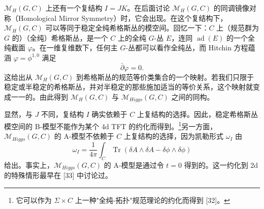 \documentclass[11pt,a4paper,UTF8]{ctexart}
\begin{document}

    $\mathcal{M}_{H}(G,C)$ 上还有一个复结构 $I=JK$。在后面讨论 $\mathcal{M}_{H}(G,C)$ 的同调镜像对称（Homological Mirror Symmetry）时，它会出现。在这个复结构下，$\mathcal{M}_{H}(G,C)$ 可以等同于稳定全纯希格斯丛的模空间。回忆一下：$C$ 上（规范群为 $G$ 的）（全纯）希格斯丛，是一个 $C$ 上的全纯 $G$-丛 $E$，连同 $\operatorname{ad}(E)$ 的一个全纯截面 $\varphi$。在一维复维数下，任何主 $G$-丛都可以看作全纯丛，而 Hitchin 方程蕴涵 $\varphi=\phi^{1,0}$ 满足
\[
    \bar\partial\varphi=0.
\]
这给出从 $\mathcal{M}_{H}(G,C)$ 到希格斯丛的规范等价类集合的一个映射。若我们只限于稳定或半稳定的希格斯丛，并对半稳定的那些施加适当的等价关系，这个映射就变成一一的。由此得到 $\mathcal{M}_{H}(G,C)$ 与 $\mathcal{M}_{Higgs}(G,C)$ 之间的同构。


显然，与 $J$ 不同，复结构 $I$ 确实依赖于 $C$ 上复结构的选择。因此，稳定希格斯丛模空间的 B-模型不能作为某个 4d TFT 的约化而得到。\footnote{它可以作为 $\Sigma\times C$ 上一种"全纯-拓扑"规范理论的约化而得到 [32]。}另一方面，$\mathcal{M}_{Higgs}(G,C)$ 的 A-模型不依赖于 $C$ 上复结构的选择，因为凯勒形式 $\omega_{I}$ 由
\[
    \omega_{I}=\frac{1}{4\pi}\int_{C}\operatorname{Tr}\left(\delta A\wedge\delta A-\delta\phi\wedge\delta\phi\right)
\]
给出。事实上，$\mathcal{M}_{Higgs}(G,C)$ 的 A-模型是通过令 $t=0$ 得到的。这一约化到 2d 的特殊情形最早在 [33] 中讨论过。

\end{document}
